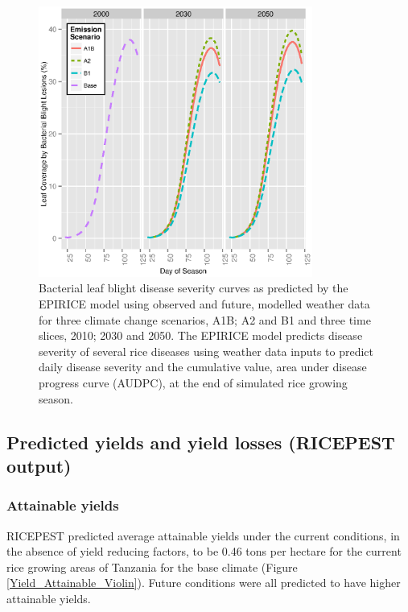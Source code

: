 \documentclass[preprint,12pt]{elsarticle}
\begin{document}
\begin{figure}[H]
  \includegraphics[width = 90mm]{figures/BB}
  \caption{Bacterial leaf blight disease severity curves as predicted by the EPIRICE model using observed and future, modelled weather data for three climate change scenarios, A1B; A2 and B1 and three time slices, 2010; 2030 and 2050. The EPIRICE model predicts disease severity of several rice diseases using weather data inputs to predict daily disease severity and the cumulative value, area under disease progress curve (AUDPC), at the end of simulated rice growing season.}
    \label{BBCurves}
\end{figure}

\subsection{Predicted yields and yield losses (RICEPEST output)}
\subsubsection{Attainable yields}
RICEPEST predicted average attainable yields under the current conditions, in the absence of yield reducing factors, to be 0.46 tons per hectare for the current rice growing areas of Tanzania for the base climate (Figure \ref{Yield_Attainable_Violin}). Future conditions were all predicted to have higher attainable yields.
\end{document}
